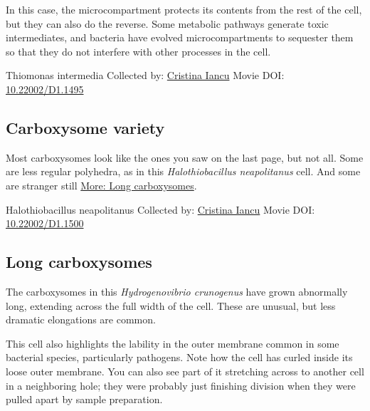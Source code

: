 \documentclass[]{tufte-book}
\begin{document}
In this case, the microcompartment protects its contents from the rest of the cell, but they can also do the reverse. Some metabolic pathways generate toxic intermediates, and bacteria have evolved microcompartments to sequester them so that they do not interfere with other processes in the cell.



\hypertarget{htmlwidget-b67475d110678ec5c9c9}{}

\label{fig:4-7}Thiomonas intermedia Collected by: \protect\hyperlink{cristina_iancu}{Cristina Iancu} Movie DOI: \href{https://doi.org/10.22002/D1.1495}{10.22002/D1.1495}

\hypertarget{Carboxysome_variety}{%
\subsection{Carboxysome variety}\label{Carboxysome_variety}}

Most carboxysomes look like the ones you saw on the last page, but not all. Some are less regular polyhedra, as in this \emph{Halothiobacillus neapolitanus} cell. And some are stranger still \protect\hyperlink{Long_carboxysomes}{More: Long carboxysomes}.



\hypertarget{htmlwidget-254892857fc3223364b6}{}

\label{fig:4-7a}Halothiobacillus neapolitanus Collected by: \protect\hyperlink{cristina_iancu}{Cristina Iancu} Movie DOI: \href{https://doi.org/10.22002/D1.1500}{10.22002/D1.1500}

\hypertarget{Long_carboxysomes}{%
\subsection{Long carboxysomes}\label{Long_carboxysomes}}

The carboxysomes in this \emph{Hydrogenovibrio crunogenus} have grown abnormally long, extending across the full width of the cell. These are unusual, but less dramatic elongations are common.

This cell also highlights the lability in the outer membrane common in some bacterial species, particularly pathogens. Note how the cell has curled inside its loose outer membrane. You can also see part of it stretching across to another cell in a neighboring hole; they were probably just finishing division when they were pulled apart by sample preparation.



\hypertarget{htmlwidget-e6cbf775e610f729adb7}{}
\end{document}
